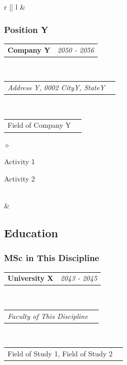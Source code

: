 \documentclass[a4paper]{article}
\makeatletter
\newlength{\sectsep}
\newlength{\subsectsep}
\newcommand{\headerrow}[2]
{\begin{tabular*}{\textwidth}{l@{\extracolsep{\fill}}r}
    #1 &
    #2 \\
\end{tabular*}}
\renewenvironment{itemize}{
  \begin{list}{$\diamond$}{
    \setlength{\topsep}{0.25em}
    \setlength{\itemsep}{0em}
    \setlength{\parskip}{0pt}
    \setlength{\parsep}{0em}
  }
}{
  \end{list}
}
\makeatother
\begin{document}
\begin{longtable}{r || l}
  & \begin{minipage}{0.9\textwidth}
      \vspace{\subsectsep}
      \subsubsection*{Position Y}
      \headerrow
        {\textbf{Company Y}}{\emph{2050 - 2056}}
      \\
      \headerrow
        {\emph{Address Y, 0002 CityY, StateY}}{}
      \\
      \headerrow
          {Field of Company Y}{}

      \begin{itemize}
          \item Activity 1
          \item Activity 2
      \end{itemize}
  \end{minipage} \\[\sectsep]


  & \begin{minipage}{0.9\textwidth}
      \vspace{\sectsep}
      \subsection*{Education}
      \subsubsection*{MSc in This Discipline}
      \headerrow
        {\textbf{University X}}{\emph{2043 - 2045}}
      \\
      \headerrow
        {\emph{Faculty of This Discipline}}{}
      \\
      \headerrow
        {Field of Study 1, Field of Study 2}{}


\end{minipage}
\end{longtable}
\end{document}
